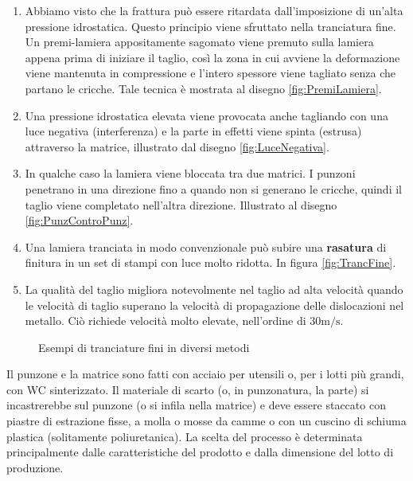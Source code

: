 \begin{enumerate}
\item Abbiamo visto che la frattura può essere ritardata dall'imposizione di un'alta pressione idrostatica.
Questo principio viene sfruttato nella tranciatura fine. Un premi-lamiera appositamente sagomato viene premuto sulla lamiera appena prima di iniziare il taglio, così la zona in cui avviene la deformazione viene mantenuta in compressione e l'intero spessore viene tagliato senza che partano le cricche.
Tale tecnica è mostrata al disegno \ref{fig:PremiLamiera}.
\item Una pressione idrostatica elevata viene provocata anche tagliando con una luce negativa (interferenza) e la parte in effetti viene spinta (estrusa) attraverso la matrice, illustrato dal disegno \ref{fig:LuceNegativa}.
\item In qualche caso la lamiera viene bloccata tra due matrici. I punzoni penetrano in una direzione fino a quando non si generano le cricche, quindi il taglio viene completato nell'altra direzione. Illustrato al disegno \ref{fig:PunzControPunz}.
\item Una lamiera tranciata in modo convenzionale può subire una \textbf{rasatura} di finitura in un set di stampi con luce molto ridotta. In figura \ref{fig:TrancFine}.
\item La qualità del taglio migliora notevolmente nel taglio ad alta velocità quando le velocità di taglio superano la velocità di propagazione delle dislocazioni nel metallo. Ciò richiede velocità molto elevate, nell'ordine di $30 \unit{\m/\s}$.
\end{enumerate}

\begin{figure}
\centering
{}
\caption{Esempi di tranciature fini in diversi metodi}
\label{fig:TranciaturaFine}
\end{figure}

Il punzone e la matrice sono fatti con acciaio per utensili o, per i lotti più grandi, con WC sinterizzato.
Il materiale di scarto (o, in punzonatura, la parte) si incastrerebbe sul punzone (o si infila nella matrice) e deve essere staccato con piastre di estrazione fisse, a molla o mosse da camme o con un cuscino di schiuma plastica (solitamente poliuretanica).
La scelta del processo è determinata principalmente dalle caratteristiche del prodotto e dalla dimensione del lotto di produzione.

